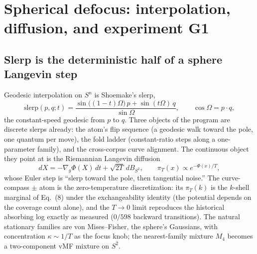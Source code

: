 \documentclass[11pt,a4paper]{article}
\theoremstyle{plain}
\theoremstyle{remark}
\begin{document}
\section{Spherical defocus: interpolation, diffusion, and experiment G1}
\label{sec:defocus}

\subsection{Slerp is the deterministic half of a sphere Langevin step}
Geodesic interpolation on $S^n$ is Shoemake's slerp,
\begin{equation}
\mathrm{slerp}(p,q;t)=\frac{\sin\big((1-t)\Omega\big)\,p+\sin(t\Omega)\,q}{\sin\Omega},\qquad\cos\Omega=p\cdot q,\tag{7}
\end{equation}
the constant-speed geodesic from $p$ to $q$. Three objects of the program are discrete slerps already: the atom's flip sequence (a geodesic walk toward the pole, one quantum per move), the fold ladder (constant-ratio steps along a one-parameter family), and the cross-corpus curve alignment. The continuous object they point at is the Riemannian Langevin diffusion
\begin{equation}
dX=-\nabla_{\!g}\Phi(X)\,dt+\sqrt{2T}\,dB_{S^2},\qquad\pi_T(x)\propto e^{-\Phi(x)/T},\tag{8}
\end{equation}
whose Euler step is ``slerp toward the pole, then tangential noise.'' The curve-compass $\pm$ atom is the zero-temperature discretization: its $\pi_T(k)$ is the $k$-shell marginal of Eq.~(8) under the exchangeability identity (the potential depends on the coverage count alone), and the $T\to0$ limit reproduces the historical absorbing log exactly as measured ($0/598$ backward transitions). The natural stationary families are von Mises--Fisher, the sphere's Gaussians, with concentration $\kappa\sim1/T$ as the focus knob; the nearest-family mixture $M_4$ becomes a two-component vMF mixture on $S^2$.
\end{document}
